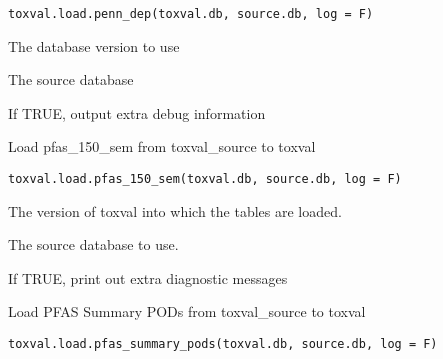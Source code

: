 \documentclass[letterpaper]{book}
\begin{document}
%
\begin{Usage}
\begin{verbatim}
toxval.load.penn_dep(toxval.db, source.db, log = F)
\end{verbatim}
\end{Usage}
%
\begin{Arguments}
\begin{ldescription}
\item[\code{toxval.db}] The database version to use

\item[\code{source.db}] The source database

\item[\code{verbose}] If TRUE, output extra debug information
\end{ldescription}
\end{Arguments}
%
\begin{Description}\relax
Load pfas\_150\_sem from toxval\_source to toxval
\end{Description}
%
\begin{Usage}
\begin{verbatim}
toxval.load.pfas_150_sem(toxval.db, source.db, log = F)
\end{verbatim}
\end{Usage}
%
\begin{Arguments}
\begin{ldescription}
\item[\code{toxval.db}] The version of toxval into which the tables are loaded.

\item[\code{source.db}] The source database to use.

\item[\code{verbose}] If TRUE, print out extra diagnostic messages
\end{ldescription}
\end{Arguments}
%
\begin{Description}\relax
Load PFAS Summary PODs from toxval\_source to toxval
\end{Description}
%
\begin{Usage}
\begin{verbatim}
toxval.load.pfas_summary_pods(toxval.db, source.db, log = F)
\end{verbatim}
\end{Usage}
\end{document}
